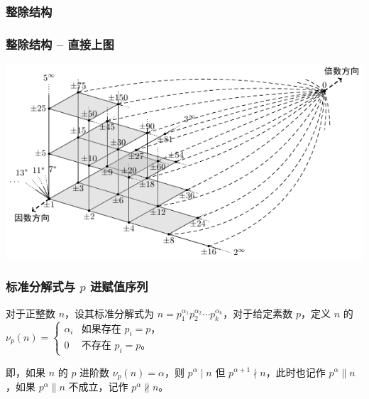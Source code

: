 \documentclass{../pkslide}
\begin{document}

\subsubsection{整除结构}


\begin{frame}[c]
  \frametitle{整除结构 -- 直接上图}
  
  \begin{center}
    \includegraphics{pics/division_structure.pdf}
  \end{center}
\end{frame}

\begin{frame}
  \frametitle{标准分解式与 $p$ 进赋值序列}
  
  \begin{definition}
    对于正整数 $n$，设其标准分解式为 $n = p_1^{\alpha_1} p_2^{\alpha_2} \cdots p_k^{\alpha_k}$，对于给定素数 $p$，定义 $n$ 的  $\nu_p(n) = \begin{cases} \alpha_i & \text{如果存在 $p_i = p$，} \\ 0 & \text{不存在 $p_i = p$。} \end{cases}$
    
    即，如果 $n$ 的 $p$ 进阶数 $\nu_p(n) = \alpha$，则 $p^\alpha \mid n$ 但 $p^{\alpha + 1} \nmid n$，此时也记作 $p^\alpha \parallel n$，如果 $p^\alpha \parallel n$ 不成立，记作 $p^\alpha \nparallel n$。
    
  \end{definition}
  
\end{frame}
\end{document}
